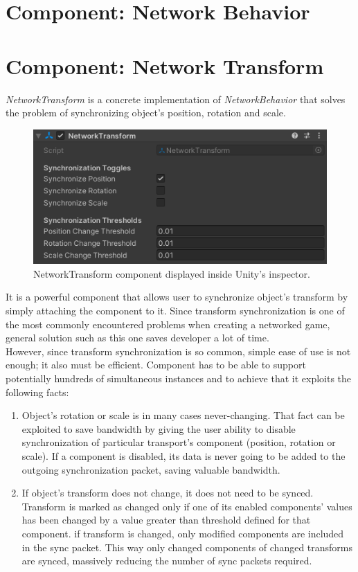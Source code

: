 \documentclass[times, utf8, diplomski]{fer}
\begin{document}
\section{Component: Network Behavior}

\section{Component: Network Transform}
\textit{NetworkTransform} is a concrete implementation of \textit{NetworkBehavior} that solves the problem of synchronizing object's position, rotation and scale.

\begin{figure}[H]
	\centering
	\includegraphics[scale=1.1]{NetworkTransform-inspector}
	\caption{NetworkTransform component displayed inside Unity's inspector.}
\end{figure}

It is a powerful component that allows user to synchronize object's transform by simply attaching the component to it. Since transform synchronization is one of the most commonly encountered problems when creating a networked game, general solution such as this one saves developer a lot of time.\\

However, since transform synchronization is so common, simple ease of use is not enough; it also must be efficient. Component has to be able to support potentially hundreds of simultaneous instances and to achieve that it exploits the following facts:

\begin{enumerate}
	\item Object's rotation or scale is in many cases never-changing. That fact can be exploited to save bandwidth by giving the user ability to disable synchronization of particular transport's component (position, rotation or scale). If a component is disabled, its data is never going to be added to the outgoing synchronization packet, saving valuable bandwidth.
	
	\item If object's transform does not change, it does not need to be synced. Transform is marked as changed only if one of its enabled components' values has been changed by a value greater than threshold defined for that component. if transform is changed, only modified components are included in the sync packet. This way only changed components of changed transforms are synced, massively reducing the number of sync packets required.
\end{enumerate}
\end{document}
